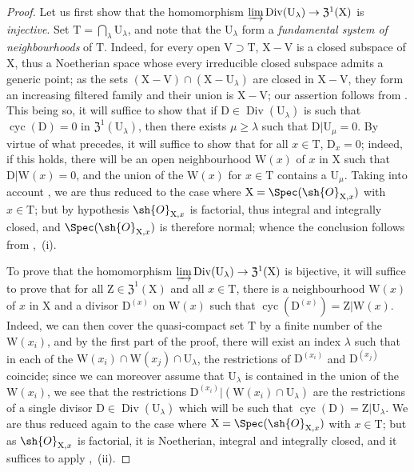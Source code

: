 \begin{proof}
Let us first show that the homomorphism $\varinjlim\operatorname{Div}(\mathrm{U}_\lambda)\to\mathfrak{Z}^1(\mathrm{X})$ is \emph{injective}.
Set $\mathrm{T}=\bigcap_\lambda\mathrm{U}_\lambda$, and note that the $\mathrm{U}_\lambda$ form a \emph{fundamental system of neighbourhoods} of $\mathrm{T}$.
Indeed, for every open $\mathrm{V}\supset\mathrm{T}$, $\mathrm{X}-\mathrm{V}$ is a closed subspace of $\mathrm{X}$, thus a Noetherian space whose every irreducible closed subspace admits a generic point;
as the sets $(\mathrm{X}-\mathrm{V})\cap(\mathrm{X}-\mathrm{U}_\lambda)$ are closed in $\mathrm{X}-\mathrm{V}$, they form an increasing filtered family and their union is $\mathrm{X}-\mathrm{V}$;
our assertion follows from .
This being so, it will suffice to show that if $\mathrm{D}\in\operatorname{Div}(\mathrm{U}_\lambda)$ is such that $\operatorname{cyc}(\mathrm{D})=0$ in $\mathfrak{Z}^1(\mathrm{U}_\lambda)$, then there exists $\mu\geq\lambda$ such that $\mathrm{D}|\mathrm{U}_\mu=0$.
By virtue of what precedes, it will suffice to show that for all $x\in\mathrm{T}$, $\mathrm{D}_x=0$;
indeed, if this holds, there will be an open neighbourhood $\mathrm{W}(x)$ of $x$ in $\mathrm{X}$ such that $\mathrm{D}|\mathrm{W}(x)=0$, and the union of the $\mathrm{W}(x)$ for $x\in\mathrm{T}$ contains a $\mathrm{U}_\mu$.
Taking into account , we are thus reduced to the case where $\mathrm{X}=\Spec(\sh{O}_{\mathrm{X},x})$ with $x\in\mathrm{T}$;
but by hypothesis $\sh{O}_{\mathrm{X},x}$ is factorial, thus integral and integrally closed, and $\Spec(\sh{O}_{\mathrm{X},x})$ is therefore normal;
whence the conclusion follows from ,{}~(i).

To prove that the homomorphism $\varinjlim\operatorname{Div}(\mathrm{U}_\lambda)\to\mathfrak{Z}^1(\mathrm{X})$ is bijective, it will suffice to prove that for all $\mathrm{Z}\in\mathfrak{Z}^1(\mathrm{X})$ and all $x\in\mathrm{T}$, there is a neighbourhood $\mathrm{W}(x)$ of $x$ in $\mathrm{X}$ and a divisor $\mathrm{D}^{(x)}$ on $\mathrm{W}(x)$ such that $\operatorname{cyc}(\mathrm{D}^{(x)})=\mathrm{Z}|\mathrm{W}(x)$.
Indeed, we can then cover the quasi-compact set $\mathrm{T}$ by a finite number of the $\mathrm{W}(x_i)$, and by the first part of the proof, there will exist an index $\lambda$ such that in each of the $\mathrm{W}(x_i)\cap\mathrm{W}(x_j)\cap\mathrm{U}_\lambda$, the restrictions of $\mathrm{D}^{(x_i)}$ and $\mathrm{D}^{(x_j)}$ coincide;
since we can moreover assume that $\mathrm{U}_\lambda$ is contained in the union of the $\mathrm{W}(x_i)$, we see that the restrictions $\mathrm{D}^{(x_i)}|(\mathrm{W}(x_i)\cap\mathrm{U}_\lambda)$ are the restrictions of a single divisor $\mathrm{D}\in\operatorname{Div}(\mathrm{U}_\lambda)$ which will be such that $\operatorname{cyc}(\mathrm{D})=\mathrm{Z}|\mathrm{U}_\lambda$.
We are thus reduced again to the case where $\mathrm{X}=\Spec(\sh{O}_{\mathrm{X},x})$ with $x\in\mathrm{T}$;
but as $\sh{O}_{\mathrm{X},x}$ is factorial, it is Noetherian, integral and integrally closed, and it suffices to apply ,{}~(ii).
\end{proof}

